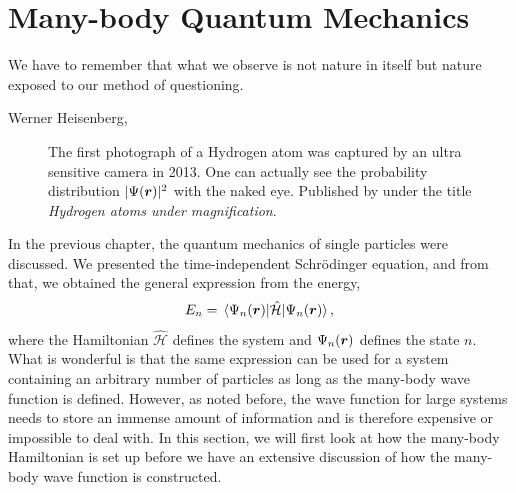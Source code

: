 \chapter{Many-body Quantum Mechanics} \label{chp:manybody}
\epigraph{We have to remember that what we observe is not nature in itself but
	nature exposed to our method of questioning.}{Werner Heisenberg, \cite{heisenberg_across_1990}}
\begin{figure}[H]
	\centering
	\captionsetup[subfigure]{labelformat=empty}
	\caption{The first photograph of a Hydrogen atom was captured by an ultra sensitive camera in 2013. One can actually see the probability distribution $|\Psi(\boldsymbol{{r}})|^2$ with the naked eye. Published by \citet{stodolna_hydrogen_2013} under the title \textit{Hydrogen atoms under magnification}.}
\end{figure}

In the previous chapter, the quantum mechanics of single particles were discussed. We presented the time-independent Schrödinger equation, and from that, we obtained the general expression from the energy,
\begin{equation}
E_n=\mel{\Psi_n(\bs{r})}{\hat{\mathcal{H}}}{\Psi_n(\bs{r})},
\label{eq:energy}
\end{equation}
where the Hamiltonian $\hat{\mathcal{H}}$ defines the system and $\Psi_n(\boldsymbol{{r}})$ defines the state $n$. What is wonderful is that the same expression can be used for a system containing an arbitrary number of particles as long as the many-body wave function is defined. However, as noted before, the wave function for large systems needs to store an immense amount of information and is therefore expensive or impossible to deal with. In this section, we will first look at how the many-body Hamiltonian is set up before we have an extensive discussion of how the many-body wave function is constructed.

